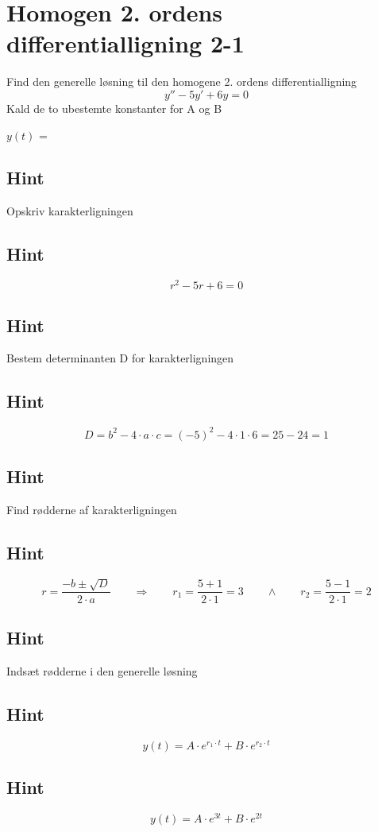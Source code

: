 \documentclass{article}
\newenvironment{exercise}[1]{\newpage\section{#1}}{}
\newcommand{\answerbox}[1]{\fbox{$#1$}}
\newcommand{\hint}{\subsection*{Hint}}
\begin{document}
\begin{exercise}{Homogen 2. ordens differentialligning 2-1}
	
	Find den generelle løsning til den homogene 2. ordens differentialligning
	\[
	y'' - 5y' + 6y = 0
	\]
	Kald de to ubestemte konstanter for A og B
	
	$y(t)$ = \answerbox{A \cdot e^{3t} + B \cdot e^{2t}}
	
	
	\hint 
	
	Opskriv karakterligningen
	
	\hint
	
	\[
	r^2 -5r + 6 = 0
	\]
	
	
	\hint
	
	Bestem determinanten D for karakterligningen
	
	
	\hint 
	\[
	D = b^2 - 4 \cdot a \cdot c = (-5)^2 - 4 \cdot 1 \cdot 6  = 25 - 24 = 1
	\]
	
	\hint 
	Find rødderne af karakterligningen
	
	
	\hint
	
	\[
	r = \frac{-b \pm \sqrt{D}}{2 \cdot a} \qquad  \Rightarrow \qquad r_1 = \frac{5 + 1}{2 \cdot 1} = 3 \qquad \wedge \qquad r_2 = \frac{5 - 1}{2 \cdot 1} = 2
	\]
	
	\hint
	
	Indsæt rødderne i den generelle løsning
	
	\hint
	\[
	y(t) = A \cdot e^{r_1 \cdot t} + B \cdot e^{r_2\cdot t}
	\]
	
	\hint
	
	\[
	y(t) = A \cdot e^{3t} + B \cdot e^{2t}
	\]
	
	
\end{exercise}

\newpage
\end{document}
